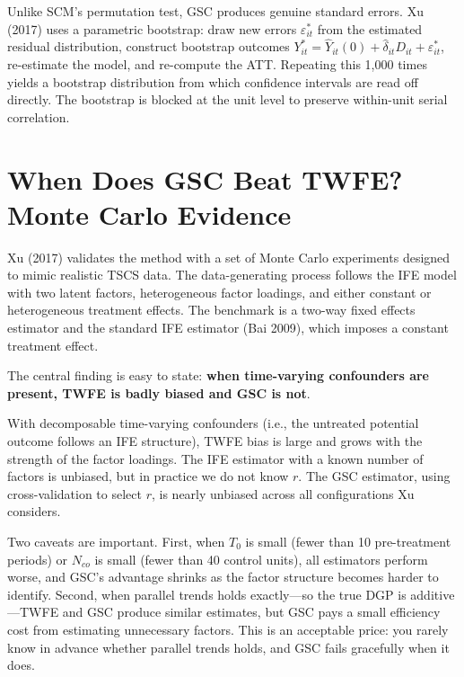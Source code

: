 \documentclass[12pt]{article}
\begin{document}
Unlike SCM's permutation test, GSC produces genuine standard errors.
Xu (2017) uses a parametric bootstrap: draw new errors $\varepsilon_{it}^*$
from the estimated residual distribution, construct bootstrap outcomes
$Y_{it}^* = \hat{Y}_{it}(0) + \hat{\delta}_{it} D_{it} + \varepsilon_{it}^*$,
re-estimate the model, and re-compute the ATT.
Repeating this 1,000 times yields a bootstrap distribution from which
confidence intervals are read off directly.
The bootstrap is blocked at the unit level to preserve within-unit serial correlation.

\section{When Does GSC Beat TWFE? Monte Carlo Evidence}

Xu (2017) validates the method with a set of Monte Carlo experiments
designed to mimic realistic TSCS data.
The data-generating process follows the IFE model with two latent factors,
heterogeneous factor loadings, and either constant or heterogeneous treatment effects.
The benchmark is a two-way fixed effects estimator and the standard IFE estimator
(Bai 2009), which imposes a constant treatment effect.

The central finding is easy to state: \textbf{when time-varying confounders are present,
TWFE is badly biased and GSC is not}.

With decomposable time-varying confounders (i.e., the untreated potential outcome
follows an IFE structure), TWFE bias is large and grows with the strength of the
factor loadings. The IFE estimator with a known number of factors is unbiased,
but in practice we do not know $r$. The GSC estimator, using cross-validation to
select $r$, is nearly unbiased across all configurations Xu considers.

Two caveats are important. First, when $T_0$ is small (fewer than 10 pre-treatment periods)
or $N_{co}$ is small (fewer than 40 control units), all estimators perform worse,
and GSC's advantage shrinks as the factor structure becomes harder to identify.
Second, when parallel trends holds exactly---so the true DGP is additive---TWFE
and GSC produce similar estimates, but GSC pays a small efficiency cost from
estimating unnecessary factors. This is an acceptable price: you rarely know in advance
whether parallel trends holds, and GSC fails gracefully when it does.
\end{document}
